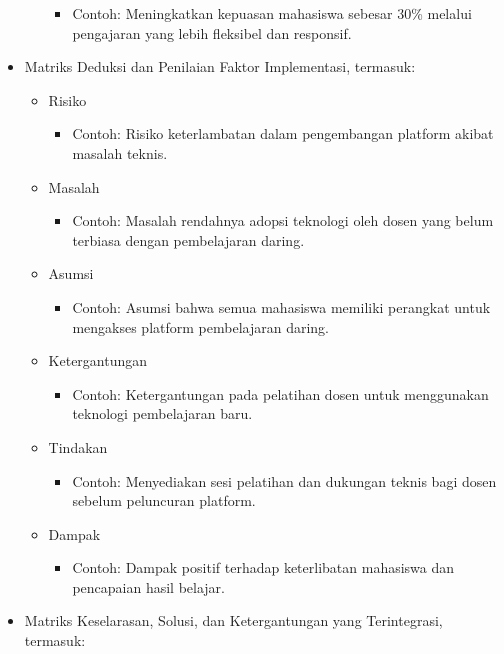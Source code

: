 \begin{itemize}
\begin{itemize}
		\begin{itemize}
			\item Contoh: Meningkatkan kepuasan mahasiswa sebesar 30\% melalui pengajaran yang lebih fleksibel dan responsif.
		\end{itemize}
	\end{itemize}
	\item Matriks Deduksi dan Penilaian Faktor Implementasi, termasuk:
	\begin{itemize}
		\item Risiko
		\begin{itemize}
			\item Contoh: Risiko keterlambatan dalam pengembangan platform akibat masalah teknis.
		\end{itemize}
		\item Masalah
		\begin{itemize}
			\item Contoh: Masalah rendahnya adopsi teknologi oleh dosen yang belum terbiasa dengan pembelajaran daring.
		\end{itemize}
		\item Asumsi
		\begin{itemize}
			\item Contoh: Asumsi bahwa semua mahasiswa memiliki perangkat untuk mengakses platform pembelajaran daring.
		\end{itemize}
		\item Ketergantungan
		\begin{itemize}
			\item Contoh: Ketergantungan pada pelatihan dosen untuk menggunakan teknologi pembelajaran baru.
		\end{itemize}
		\item Tindakan
		\begin{itemize}
			\item Contoh: Menyediakan sesi pelatihan dan dukungan teknis bagi dosen sebelum peluncuran platform.
		\end{itemize}
		\item Dampak
		\begin{itemize}
			\item Contoh: Dampak positif terhadap keterlibatan mahasiswa dan pencapaian hasil belajar.
		\end{itemize}
	\end{itemize}
	\item Matriks Keselarasan, Solusi, dan Ketergantungan yang Terintegrasi, termasuk:
	\begin{itemize}

\end{itemize}
\end{itemize}
